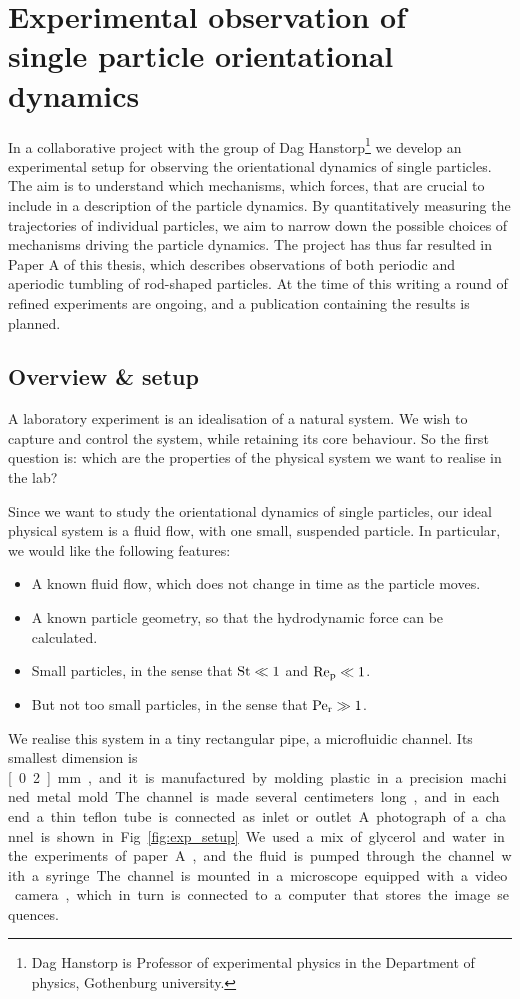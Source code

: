 \documentclass[thesis.tex]{subfiles}
\begin{document}
\chapter{Experimental observation of \\single particle orientational dynamics}\label{sec:experiment}

In a collaborative project with the group of Dag Hanstorp\footnote{Dag Hanstorp is Professor of experimental physics in the Department of physics, Gothenburg university.} we develop an experimental setup for observing the orientational dynamics of single particles. The aim is to understand which mechanisms, which forces, that are crucial to include in a description of the particle dynamics. By quantitatively measuring the trajectories of individual particles, we aim to narrow down the possible choices of mechanisms driving the particle dynamics. The project has thus far resulted in Paper A of this thesis, which describes observations of both periodic and aperiodic tumbling of rod-shaped particles. At the time of this writing a round of refined experiments are ongoing, and a publication containing the results is planned.

\section{Overview \& setup}

A laboratory experiment is an idealisation of a natural system. We wish to capture and control the system, while retaining its core behaviour. So the first question is: which are the properties of the physical system we want to realise in the lab?

Since we want to study the orientational dynamics of single particles, our ideal physical system is a fluid flow, with one small, suspended particle. In particular, we would like the following features:
\begin{itemize}
	\item A known fluid flow, which does not change in time as the particle moves.
	\item A known particle geometry, so that the hydrodynamic force can be calculated.
	\item Small particles, in the sense that $\mbox{St}\ll1$ and $\mbox{Re}_{\mathrm p}\ll1$.
	\item But not too small particles, in the sense that $\mbox{Pe}_{\mathrm r}\gg1$.
\end{itemize}
We realise this system in a tiny rectangular pipe, a microfluidic channel. Its smallest dimension is \unit[0.2]{mm}, and it is manufactured by molding plastic in a precision machined metal mold. The channel is made several centimeters long, and in each end a thin teflon tube is connected as inlet or outlet. A photograph of a channel is shown in Fig.~\ref{fig:exp_setup}. We used a mix of glycerol and water in the experiments of paper A, and the fluid is pumped through the channel with a syringe. The channel is mounted in a microscope equipped with a video camera, which in turn is connected to a computer that stores the image sequences.
\end{document}
